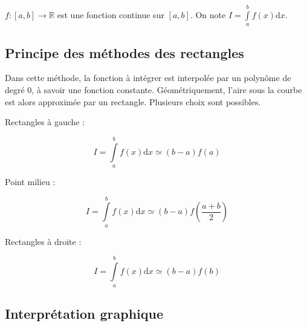 \documentclass[10pt,fleqn]{article} %
\begin{document}

\vspace{2cm}
\pagestyle{fancy}
\thispagestyle{plain}

\begin{hypo}  $f:[a,b]\rightarrow \mathbb{R}$ est une fonction continue sur $[a,b]$. On note $I = \int\limits_a^{b} f(x) \mathrm{d}x $.
\end{hypo}

\subsection*{Principe des méthodes des rectangles}
\begin{defi}
Dans cette méthode, la fonction à intégrer est interpolée par un polynôme de degré 0, à savoir une fonction constante. Géométriquement, l'aire sous la courbe est alors approximée par un rectangle. Plusieurs choix sont possibles.

\begin{minipage}[c]{.3\linewidth}
Rectangles à gauche :

$$
I = \int\limits_a^{b} f(x) \mathrm{d}x \simeq \left(b-a\right) f(a) 
$$
\end{minipage}\hfill
\begin{minipage}[c]{.3\linewidth}
Point milieu :

$$
I = \int\limits_a^{b} f(x) \mathrm{d}x \simeq \left(b-a\right) f\left(\dfrac{a+b}{2}\right) 
$$
\end{minipage}\hfill
\begin{minipage}[c]{.3\linewidth}
Rectangles à droite :

$$
I = \int\limits_a^{b} f(x) \mathrm{d}x \simeq \left(b-a\right) f(b) 
$$
\end{minipage}
\end{defi}

\subsection*{Interprétation graphique}
\end{document}
